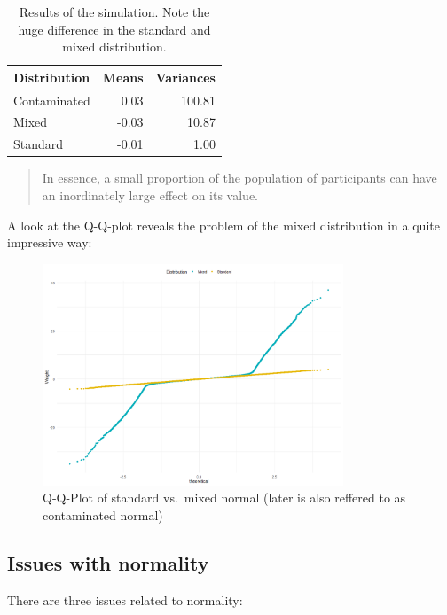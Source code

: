 \documentclass[
]{article}
\begin{document}
\begin{table}

\caption{\label{tab:Wilcox-2-Simiulation}Results of the simulation. Note the huge difference in the standard and mixed distribution.}
\centering
\begin{tabular}[t]{l|r|r}
\hline
Distribution & Means & Variances\\
\hline
Contaminated & 0.03 & 100.81\\
\hline
Mixed & -0.03 & 10.87\\
\hline
Standard & -0.01 & 1.00\\
\hline
\end{tabular}
\end{table}

\begin{quote}
In essence, a small proportion of the population of participants can have an inordinately large effect on its value.
\end{quote}

A look at the Q-Q-plot reveals the problem of the mixed distribution in a quite impressive way:

\begin{figure}
\centering
\includegraphics[width=0.8\textwidth,height=\textheight]{Images/Wilcox-2-QQ-Plot.jpg}
\caption{Q-Q-Plot of standard vs.~mixed normal (later is also reffered to as contaminated normal)}
\end{figure}

\subsection*{Issues with normality}\label{issues-with-normality}

There are three issues related to normality:
\end{document}
